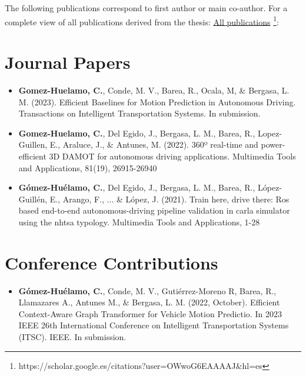 \begin{refsection}

The following publications correspond to first author or main co-author. For a complete view of all publications derived from the thesis: \href{https://scholar.google.es/citations?user=OWwoG6EAAAAJ\&hl=es}{All publications} \footnote{https://scholar.google.es/citations?user=OWwoG6EAAAAJ\&hl=es}:

\section*{Journal Papers}

\begin{itemize}

\item \textbf{Gomez-Huelamo, C.}, Conde, M. V., Barea, R., Ocala, M, \& Bergasa, L. M. (2023). Efficient Baselines for Motion Prediction in Autonomous Driving. Transactions on Intelligent Transportation Systems. In submission.

\item \textbf{Gomez-Huelamo, C.}, Del Egido, J., Bergasa, L. M., Barea, R., Lopez-Guillen, E., Araluce, J., \& Antunes, M. (2022). 360º real-time and power-efficient 3D DAMOT for autonomous driving applications. Multimedia Tools and Applications, 81(19), 26915-26940

\item \textbf{Gómez-Huélamo, C.}, Del Egido, J., Bergasa, L. M., Barea, R., López-Guillén, E., Arango, F., ... \& López, J. (2021). Train here, drive there: Ros based end-to-end autonomous-driving pipeline validation in carla simulator using the nhtsa typology. Multimedia Tools and Applications, 1-28

\end{itemize}

\section*{Conference Contributions}

\begin{itemize}

\item \textbf{Gómez-Huélamo, C.}, Conde, M. V., Gutiérrez-Moreno R, Barea, R., Llamazares A., Antunes M., \& Bergasa, L. M. (2022, October). Efficient Context-Aware Graph Transformer for Vehicle Motion Predictio. In 2023 IEEE 26th International Conference on Intelligent Transportation Systems (ITSC). IEEE. In submission.


\end{itemize}
\end{refsection}
